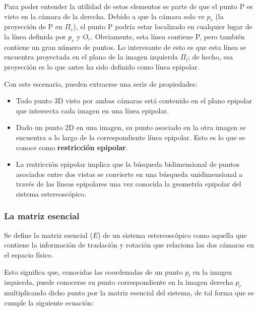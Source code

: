 Para poder entender la utilidad de estos elementos se parte de que el punto P es visto en la cámara de la derecha. Debido a que la cámara solo ve $p_{r}$ (la proyección de P en $\Pi_{r}$), el punto P podría estar localizado en cualquier lugar de la línea definida por $p_{r}$ y $O_{r}$. Obviamente, esta línea contiene P, pero también contiene un gran número de puntos. Lo interesante de esto es que esta línea se encuentra proyectada en el plano de la imagen izquierda $\Pi_{l}$; de hecho, esa proyección es lo que antes ha sido definido como línea epipolar.

Con este escenario, pueden extraerse una serie de propiedades:

\begin{itemize}
\item Todo punto 3D visto por ambas cámaras está contenido en el plano epipolar que intersecta cada imagen en una línea epipolar.
\item Dado un punto 2D en una imagen, su punto asociado en la otra imagen se encuentra a lo largo de la correspondiente línea epipolar. Esto es lo que se conoce como \textbf{restricción epipolar}.
\item La restricción epipolar implica que la búsqueda bidimensional de puntos asociados entre dos vistas se convierte en una búsqueda unidimensional a través de las líneas epipolares una vez conocida la geometría epipolar del sistema estereoscópico.
\end{itemize}




\subsubsection{La matriz esencial}

Se define la matriz esencial ($E$) de un sistema estereoscópico como aquella que contiene la información de traslación y rotación que relaciona las dos cámaras en el espacio físico.

Esto significa que, conocidas las coordenadas de un punto $p_{l}$ en la imagen izquierda, puede conocerse su punto correspondiente en la imagen derecha $p_{r}$ multiplicando dicho punto por la matriz esencial del sistema, de tal forma que se cumple la siguiente ecuación:


